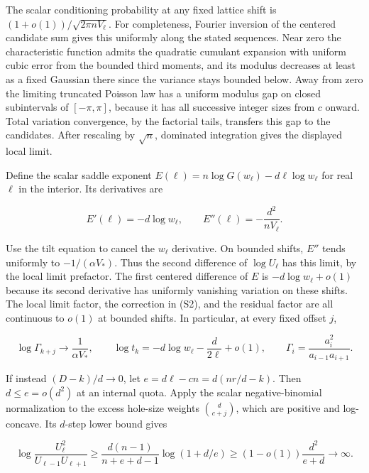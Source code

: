 The scalar conditioning probability at any fixed lattice shift is $(1+o(1))/\sqrt{2\pi nV_\ell}$. For completeness, Fourier inversion of the centered candidate sum gives this uniformly along the stated sequences. Near zero the characteristic function admits the quadratic cumulant expansion with uniform cubic error from the bounded third moments, and its modulus decreases at least as a fixed Gaussian there since the variance stays bounded below. Away from zero the limiting truncated Poisson law has a uniform modulus gap on closed subintervals of $[-\pi,\pi]$, because it has all successive integer sizes from $c$ onward. Total variation convergence, by the factorial tails, transfers this gap to the candidates. After rescaling by $\sqrt n$, dominated integration gives the displayed local limit.

Define the scalar saddle exponent $E(\ell)=n\log G(w_\ell)-d\ell\log w_\ell$ for real $\ell$ in the interior. Its derivatives are

\begin{equation*}
E'(\ell)=-d\log w_\ell,\qquad E''(\ell)=-\frac{d^2}{nV_\ell}.
\end{equation*}

Use the tilt equation to cancel the $w_\ell$ derivative. On bounded shifts, $E''$ tends uniformly to $-1/(\alpha V_*)$. Thus the second difference of $\log U_\ell$ has this limit, by the local limit prefactor. The first centered difference of $E$ is $-d\log w_\ell+o(1)$ because its second derivative has uniformly vanishing variation on these shifts. The local limit factor, the correction in (S2), and the residual factor are all continuous to $o(1)$ at bounded shifts. In particular, at every fixed offset $j$,

\begin{equation}
\log\Gamma_{k+j}\longrightarrow\frac1{\alpha V_*},
\qquad
\log t_k=-d\log w_\ell-\frac{d}{2\ell}+o(1),
\qquad
\Gamma_i=\frac{a_i^2}{a_{i-1}a_{i+1}}.
\tag{S4}
\end{equation}

If instead $(D-k)/d\to0$, let $e=d\ell-cn=d(nr/d-k)$. Then $d\le e=o(d^2)$ at an internal quota. Apply the scalar negative-binomial normalization to the excess hole-size weights $\binom d{c+j}$, which are positive and log-concave. Its $d$-step lower bound gives

\begin{equation*}
\log\frac{U_\ell^2}{U_{\ell-1}U_{\ell+1}}
\ge\frac{d(n-1)}{n+e+d-1}\log(1+d/e)
\ge (1-o(1))\frac{d^2}{e+d}\longrightarrow\infty.
\end{equation*}

